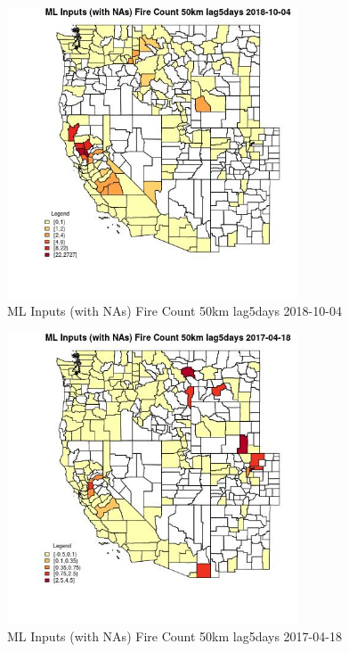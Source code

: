 \clearpage 

\begin{figure} 
\centering  
\includegraphics[width=0.77\textwidth]{Code_Outputs/Report_ML_input_PM25_Step4_part_f_de_duplicated_aves_prioritize_24hr_obswNAs_CountyFire_Count_50km_lag5daysMean2018-10-04.jpg} 
\caption{\label{fig:Report_ML_input_PM25_Step4_part_f_de_duplicated_aves_prioritize_24hr_obswNAsCountyFire_Count_50km_lag5daysMean2018-10-04}ML Inputs (with NAs) Fire Count 50km lag5days 2018-10-04} 
\end{figure} 
 

\begin{figure} 
\centering  
\includegraphics[width=0.77\textwidth]{Code_Outputs/Report_ML_input_PM25_Step4_part_f_de_duplicated_aves_prioritize_24hr_obswNAs_CountyFire_Count_50km_lag5daysMean2017-04-18.jpg} 
\caption{\label{fig:Report_ML_input_PM25_Step4_part_f_de_duplicated_aves_prioritize_24hr_obswNAsCountyFire_Count_50km_lag5daysMean2017-04-18}ML Inputs (with NAs) Fire Count 50km lag5days 2017-04-18} 
\end{figure} 
 

